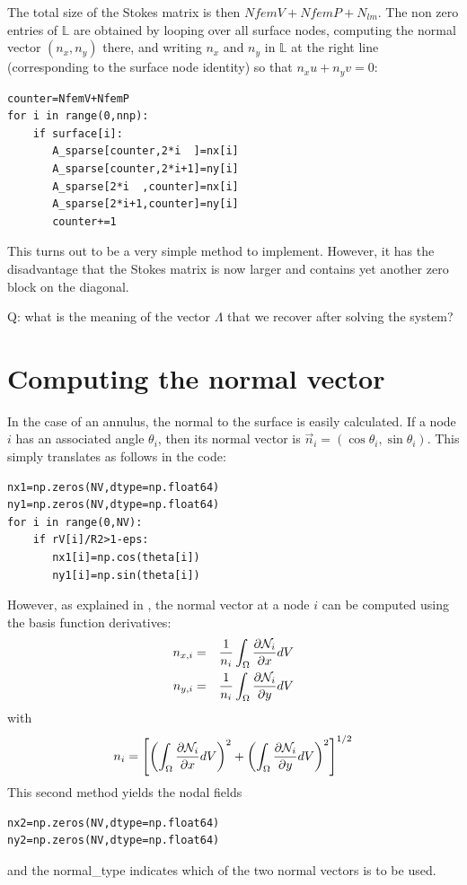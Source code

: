 The total size of the Stokes matrix is then $NfemV+NfemP+N_{lm}$.
The non zero entries of $\mathbb{L}$ are obtained by 
looping over all surface nodes, computing the normal vector $(n_x,n_y)$ there, and 
writing $n_x$ and $n_y$ in $\mathbb{L}$ at the right line (corresponding to the 
surface node identity) so that $n_x u + n_y v = 0$:
\begin{lstlisting}
counter=NfemV+NfemP
for i in range(0,nnp):
    if surface[i]:
       A_sparse[counter,2*i  ]=nx[i]
       A_sparse[counter,2*i+1]=ny[i]
       A_sparse[2*i  ,counter]=nx[i]
       A_sparse[2*i+1,counter]=ny[i]
       counter+=1
\end{lstlisting}

This turns out to be a very simple method to implement. However, it has the disadvantage that 
the Stokes matrix is now larger and contains yet another zero block on the diagonal.

Q: what is the meaning of the vector $\Lambda$ that we recover after solving the system?

\newpage
\section*{Computing the normal vector}

In the case of an annulus, the normal to the surface is easily calculated. If a node $i$
has an associated angle $\theta_i$, then its normal vector is $\vec{n}_i=(\cos\theta_i,\sin\theta_i)$.
This simply translates as follows in the code:

\begin{lstlisting}
nx1=np.zeros(NV,dtype=np.float64) 
ny1=np.zeros(NV,dtype=np.float64) 
for i in range(0,NV):
    if rV[i]/R2>1-eps:
       nx1[i]=np.cos(theta[i])
       ny1[i]=np.sin(theta[i])
\end{lstlisting}

However, as explained in \textcite{ensg82}, the normal vector at a node $i$ can be computed using the 
basis function derivatives:
\begin{eqnarray}
n_{x,i} &=& \frac{1}{n_i}\int_\Omega \frac{\partial {\mathcal{N}}_i}{\partial x} dV \nonumber\\
n_{y,i} &=& \frac{1}{n_i}\int_\Omega \frac{\partial {\mathcal{N}}_i}{\partial y} dV \nonumber
\end{eqnarray}
with 
\[
n_i = \left[
\left(\int_\Omega \frac{\partial {\mathcal{N}}_i}{\partial x} dV\right)^2 +
\left(\int_\Omega \frac{\partial {\mathcal{N}}_i}{\partial y} dV\right)^2 
\right]^{1/2}
\]
This second method yields the nodal fields
\begin{lstlisting}
nx2=np.zeros(NV,dtype=np.float64) 
ny2=np.zeros(NV,dtype=np.float64) 
\end{lstlisting}
and the {\python normal\_type} indicates which of the two normal vectors is to be 
used.  

